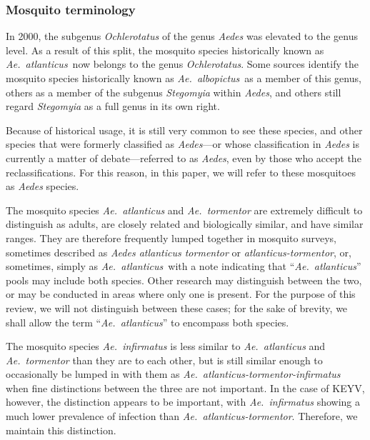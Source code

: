 \documentclass[12pt]{article}
\newcommand{\alb}{\textit{Ae.\ albopictus}}
\newcommand{\atl}{\textit{Ae.\ atlanticus}}
\begin{document}
            \subsubsection{Mosquito terminology}
                \label{mosquito-terminology}
                In 2000, the subgenus \textit{Ochlerotatus} of the genus \textit{Aedes} was elevated to the genus level. As a result of this split, the mosquito species historically known as \atl\ now belongs to the genus \textit{Ochlerotatus}\cite{reinert2000new}. Some sources identify the mosquito species historically known as \alb\ as a member of this genus, others as a member of the subgenus \textit{Stegomyia} within \textit{Aedes}, and others still regard \textit{Stegomyia} as a full genus in its own right.
                
                Because of historical usage, it is still very common to see these species, and other species that were formerly classified as \textit{Aedes}---or whose classification in \textit{Aedes} is currently a matter of debate---referred to as \textit{Aedes}, even by those who accept the reclassifications. For this reason, in this paper, we will refer to these mosquitoes as \textit{Aedes} species.

                The mosquito species \textit{Ae.~atlanticus} and \textit{Ae.~tormentor} are extremely difficult to distinguish as adults, are closely related and biologically similar, and have similar ranges\cite{burkett2013mosquitoes}. They are therefore frequently lumped together in mosquito surveys, sometimes described as \textit{Aedes atlanticus tormentor}\cite{bond1966california} or \textit{atlanticus-tormentor}, or, sometimes, simply as \atl\, with a note indicating that ``\atl'' pools may include both species. Other research may distinguish between the two, or may be conducted in areas where only one is present. For the purpose of this review, we will not distinguish between these cases; for the sake of brevity, we shall allow the term ``\atl'' to encompass both species.

                The mosquito species \textit{Ae.~infirmatus} is less similar to \textit{Ae.~atlanticus} and \textit{Ae.~tormentor} than they are to each other, but is still similar enough to occasionally be lumped in with them as \textit{Ae.~atlanticus-tormentor-infirmatus} when fine distinctions between the three are not important. In the case of KEYV, however, the distinction appears to be important, with \textit{Ae.~infirmatus} showing a much lower prevalence of infection than \textit{Ae.~atlanticus-tormentor}.\cite{taylor1971california} Therefore, we maintain this distinction.
\end{document}
